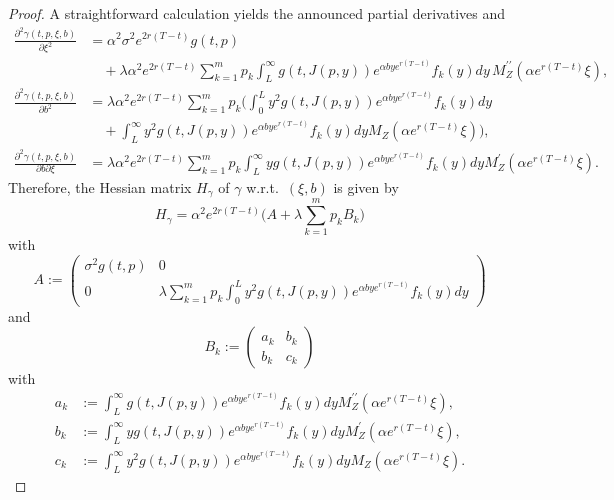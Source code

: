 \documentclass[reqno, 11pt]{amsart}%
\theoremstyle{definition}
\numberwithin{equation}{section} \numberwithin{theorem}{section}
\begin{document}
\begin{proof}
   A straightforward calculation yields the announced partial derivatives and
	\begin{align*}
   \frac{\partial^2\gamma(t,p,\xi,b)}{\partial \xi^2} &= \alpha^2\sigma^2e^{2r(T-t)}g(t,p) \\
   &\quad + \lambda\alpha^2e^{2r(T-t)}\sum_{k=1}^m p_k\int_L^\infty\! g(t,J(p,y))e^{\alpha b y e^{r(T-t)}}f_k(y)dy\,M_Z^{\prime\prime}(\alpha e^{r(T-t)}\xi),\\
\frac{\partial^2\gamma(t,p,\xi,b)}{\partial b^2} &= \lambda\alpha^2e^{2r(T-t)}\sum_{k=1}^m p_k\bigg(\int_0^L y^2g(t,J(p,y))e^{\alpha b y e^{r(T-t)}}f_k(y)dy\\
&\quad +\int_L^\infty y^2g(t,J(p,y))e^{\alpha b y e^{r(T-t)}}f_k(y)dy M_Z(\alpha e^{r(T-t)}\xi)\bigg), \\
\frac{\partial^2\gamma(t,p,\xi,b)}{\partial b\partial\xi} &= \lambda\alpha^2e^{2r(T-t)}\sum_{k=1}^m p_k\int_L^\infty yg(t,J(p,y))e^{\alpha b y e^{r(T-t)}}f_k(y)dy M_Z^\prime(\alpha e^{r(T-t)}\xi).
\end{align*}
Therefore, the Hessian matrix $H_\gamma$ of $\gamma$ w.r.t.\ $(\xi,b)$ is given by
\begin{equation*}
H_\gamma=\alpha^2e^{2r(T-t)}\Big(A+\lambda\sum_{k=1}^m p_k B_k\Big)
\end{equation*}
with
\begingroup
\renewcommand*{\arraystretch}{1.4}
\begin{equation*}
A:=\begin{pmatrix}
\sigma^2g(t,p) & 0 \\
0 & \lambda\sum_{k=1}^m p_k\int_0^L y^2g(t,J(p,y))e^{\alpha b y e^{r(T-t)}}f_k(y)dy
\end{pmatrix}
\end{equation*}
and
\begin{equation*}
B_k:=\begin{pmatrix}
a_k &  b_k \\
b_k & c_k
\end{pmatrix}
\end{equation*}
\endgroup
with
\begin{align*}
a_k &:= \int_L^\infty g(t,J(p,y))e^{\alpha b y e^{r(T-t)}}f_k(y)dy M_Z^{\prime\prime}(\alpha e^{r(T-t)}\xi),\\
b_k &:= \int_L^\infty yg(t,J(p,y))e^{\alpha b y e^{r(T-t)}}f_k(y)dy M_Z^\prime(\alpha e^{r(T-t)}\xi),\\
c_k &:= \int_L^\infty y^2g(t,J(p,y))e^{\alpha b y e^{r(T-t)}}f_k(y)dy M_Z(\alpha e^{r(T-t)}\xi).
\end{align*}

\end{proof}
\end{document}
